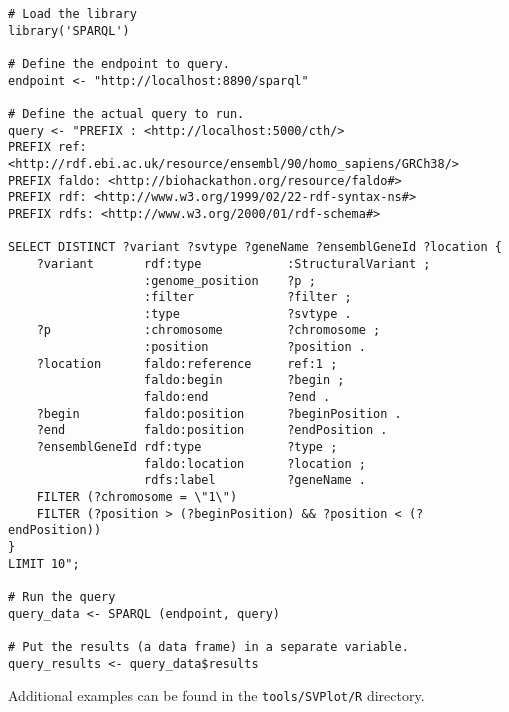 \documentclass[11pt,a4paper,oneside]{book}
\begin{document}
\begin{siderules}
\begin{verbatim}
# Load the library
library('SPARQL')

# Define the endpoint to query.
endpoint <- "http://localhost:8890/sparql"

# Define the actual query to run.
query <- "PREFIX : <http://localhost:5000/cth/>
PREFIX ref: <http://rdf.ebi.ac.uk/resource/ensembl/90/homo_sapiens/GRCh38/>
PREFIX faldo: <http://biohackathon.org/resource/faldo#>
PREFIX rdf: <http://www.w3.org/1999/02/22-rdf-syntax-ns#>
PREFIX rdfs: <http://www.w3.org/2000/01/rdf-schema#>

SELECT DISTINCT ?variant ?svtype ?geneName ?ensemblGeneId ?location {
    ?variant       rdf:type            :StructuralVariant ;
                   :genome_position    ?p ;
                   :filter             ?filter ;
                   :type               ?svtype .
    ?p             :chromosome         ?chromosome ;
                   :position           ?position .
    ?location      faldo:reference     ref:1 ;
                   faldo:begin         ?begin ;
                   faldo:end           ?end .
    ?begin         faldo:position      ?beginPosition .
    ?end           faldo:position      ?endPosition .
    ?ensemblGeneId rdf:type            ?type ;
                   faldo:location      ?location ;
                   rdfs:label          ?geneName .
    FILTER (?chromosome = \"1\")
    FILTER (?position > (?beginPosition) && ?position < (?endPosition))
}
LIMIT 10";

# Run the query
query_data <- SPARQL (endpoint, query)

# Put the results (a data frame) in a separate variable.
query_results <- query_data$results
\end{verbatim}
\end{siderules}

Additional examples can be found in the \texttt{tools/SVPlot/R} directory.
\end{document}
